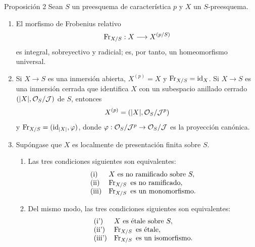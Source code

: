 \begin{statement}{Proposición 2}
Sean $S$ un preesquema de característica $p$ y $X$ un $S$-preesquema.
\begin{enumerate}[label=\alph*)]
\item El morfismo de Frobenius relativo
\[
\operatorname{Fr}_{X/S}:X\longrightarrow X^{(p/S)}
\]
es integral, sobreyectivo y radicial; es, por tanto, un homeomorfismo universal.

\item Si $X\to S$ es una inmersión abierta, $X^{(p)}=X$ y $\operatorname{Fr}_{X/S}=\operatorname{id}_X$. Si $X\to S$ es una inmersión cerrada que identifica $X$ con un subespacio anillado cerrado $(|X|,\mathcal{O}_S/\mathcal J)$ de $S$, entonces
\[
X^{(p)}=(|X|,\mathcal{O}_S/\mathcal J^p)
\]
y $\operatorname{Fr}_{X/S}=(\operatorname{id}_{|X|},\varphi)$, donde $\varphi:\mathcal{O}_S/\mathcal J^p\to\mathcal{O}_S/\mathcal J$ es la proyección canónica.

\item Supóngase que $X$ es localmente de presentación finita sobre $S$.
\begin{enumerate}[label=\arabic*)]
\item Las tres condiciones siguientes son equivalentes:
\[
\begin{array}{ll}
\text{(i)}& X\text{ es no ramificado sobre }S,\\
\text{(ii)}& \operatorname{Fr}_{X/S}\text{ es no ramificado},\\
\text{(iii)}& \operatorname{Fr}_{X/S}\text{ es un monomorfismo}.
\end{array}
\]
\item Del mismo modo, las tres condiciones siguientes son equivalentes:
\[
\begin{array}{ll}
\text{(i')}& X\text{ es étale sobre }S,\\
\text{(ii')}& \operatorname{Fr}_{X/S}\text{ es étale},\\
\text{(iii')}& \operatorname{Fr}_{X/S}\text{ es un isomorfismo}.
\end{array}
\]
\end{enumerate}
\end{enumerate}
\end{statement}
